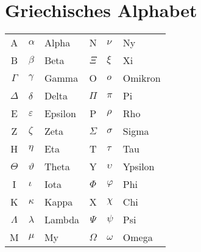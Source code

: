 \section{Griechisches Alphabet}

\begin{table}[h!]
\begin{tabular}{c p{} p{} c p{} l}
	A & $\alpha$ & Alpha 		& N & $\nu$ & Ny \\
	B & $\beta$ & Beta 		& $\Xi$ & $\xi$ & Xi \\
	$\Gamma$ & $\gamma$ & Gamma 	& O & $o$ & Omikron \\
	$\Delta$ & $\delta$ & Delta 	& $\Pi$ & $\pi$ & Pi \\
	E & $\varepsilon$ & Epsilon 	& P & $\rho$ & Rho \\
	Z & $\zeta$ & Zeta 		& $\Sigma$ & $\sigma$ & Sigma \\
	H & $\eta$ & Eta 		& T & $\tau$ & Tau \\
	$\Theta$ & $\vartheta$ & Theta 	& Y & $\upsilon$ & Ypsilon \\
	I & $\iota$ & Iota 		& $\Phi$ & $\varphi$ & Phi \\
	K & $\kappa$ & Kappa 		& X & $\chi$ & Chi \\
	$\Lambda$ & $\lambda$ & Lambda 	& $\Psi$ & $\psi$ & Psi \\
	M & $\mu$ & My 			& $\Omega$ & $\omega$ & Omega \\
\end{tabular}
\end{table}

